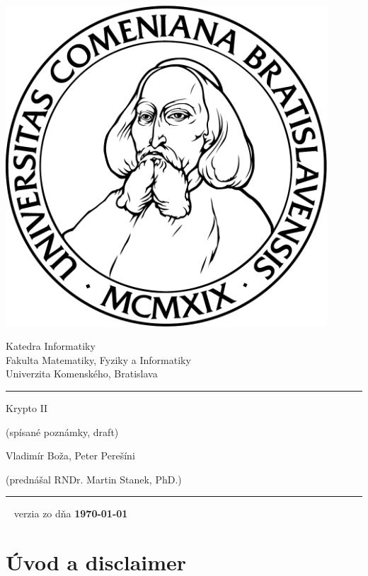 \documentclass[a4paper]{report}
\begin{document}
\thispagestyle{empty}
\begin{minipage}{0.25\textwidth}
\includegraphics[width=0.9\textwidth]{img/komlogo-new}
\end{minipage}
\begin{minipage}{0.69\textwidth}
\begin{center}
\sc Katedra Informatiky \\
Fakulta Matematiky, Fyziky a Informatiky \\
Univerzita Komenského, Bratislava
\end{center}
\end{minipage}

\vfill
\begin{center}
\begin{minipage}{0.8\textwidth}
\hrule
\bigskip\bigskip
\centerline{\LARGE\sc Krypto II}
\smallskip
\centerline{(spísané poznámky, draft)}
\bigskip
\bigskip
\centerline{\large\sc Vladimír Boža, Peter Perešíni}
\bigskip
\centerline{\large\sc (prednášal RNDr. Martin Stanek, PhD.)}
\bigskip\bigskip
\hrule
\end{minipage}
\end{center}
\vfill
{~}
\hfill verzia zo dňa {\bf\today} 
\eject %

\section*{Úvod a disclaimer}
\end{document}
